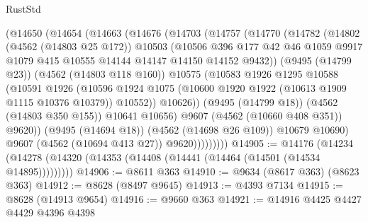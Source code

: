 \begin{lexlean}{RustStd}
\begin{coremodule}
                (@14650
                  (@14654
                    (@14663
                      (@14676
                        (@14703
                          (@14757
                            (@14770
                              (@14782
                                (@14802
                                  (@4562 (@14803 @25 @172))
                                  @10503
                                  (@10506
                                    @396
                                    @177
                                    @42
                                    @46
                                    @1059
                                    @9917
                                    @1079
                                    @415
                                    @10555
                                    @14144
                                    @14147
                                    @14150
                                    @14152
                                    @9432))
                                (@9495 (@14799 @23))
                                (@4562 (@14803 @118 @160))
                                @10575
                                (@10583
                                  @1926
                                  @1295
                                  @10588
                                  (@10591
                                    @1926
                                    (@10596
                                      @1924
                                      @1075
                                      (@10600 @1920 @1922 (@10613 @1909 @1115 @10376 @10379))
                                      @10552))
                                  @10626))
                              (@9495 (@14799 @18))
                              (@4562 (@14803 @350 @155))
                              @10641
                              @10656)
                            @9607
                            (@4562 (@10660 @408 @351))
                            @9620))
                        (@9495 (@14694 @18))
                        (@4562 (@14698 @26 @109))
                        @10679
                        @10690)
                      @9607
                      (@4562 (@10694 @413 @27))
                      @9620)))))))))
@14905 := @14176
    (@14234 (@14278 (@14320 (@14353 (@14408 (@14441 (@14464 (@14501 (@14534 @14895)))))))))
@14906 := @8611 @363
@14910 := @9634 (@8617 @363) (@8623 @363)
@14912 := @8628 (@8497 @9645)
@14913 := @4393 @7134
@14915 := @8628 (@14913 @9654)
@14916 := @9660 @363
@14921 := @14916 @4425 @4427 @4429 @4396 @4398

\end{coremodule}
\end{lexlean}
